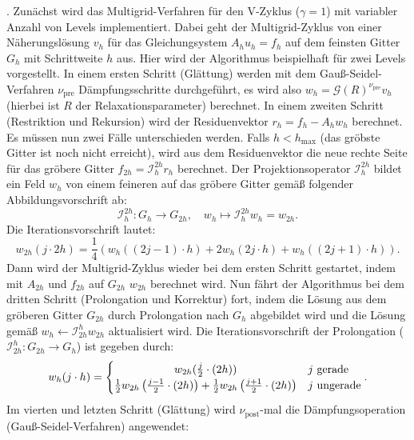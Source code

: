 \documentclass[11pt,a4paper]{article}
\begin{document}
. Zunächst wird das Multigrid-Verfahren für den V-Zyklus ($\gamma = 1$) mit variabler Anzahl von Levels implementiert. Dabei geht der Multigrid-Zyklus von einer Näherungslösung $v_h$ für das Gleichungsystem $A_h u_h = f_h$ auf dem
feinsten Gitter $G_h$ mit Schrittweite $h$ aus. Hier wird der Algorithmus beispielhaft für zwei Levels vorgestellt. In einem ersten Schritt (Glättung) werden mit dem Gauß-Seidel-Verfahren $\nu_{\mathrm{pre}}$ Dämpfungsschritte durchgeführt, es wird also $w_h = \mathcal{G}(R)^{\nu_{\mathrm{pre}}} v_h$ (hierbei ist $R$ der Relaxationsparameter) berechnet.
In einem zweiten Schritt (Restriktion und Rekursion) wird der Residuenvektor $r_h = f_h - A_h w_h$ berechnet. Es müssen nun zwei Fälle unterschieden werden. Falls $h<h_{\mathrm{max}}$ (das gröbste Gitter ist noch nicht erreicht), wird aus dem Residuenvektor die neue rechte Seite für das gröbere
Gitter $f_{2h} = \mathcal{I}_h^{2h} r_h$ berechnet. Der Projektionsoperator $\mathcal{I}_h^{2h}$ bildet ein Feld $w_h$ von einem feineren auf das gröbere Gitter gemäß folgender Abbildungsvorschrift ab:
\begin{equation*}
    \mathcal{I}_h^{2h} : G_h \rightarrow G_{2h} , \quad w_h \mapsto \mathcal{I}_h^{2h} w_h = w_{2h} .
\end{equation*} Die Iterationsvorschrift lautet:
\begin{equation*}
    w_{2h}(j \cdot 2h) = \frac{1}{4} (w_h((2j - 1) \cdot h) + 2 w_h(2j \cdot h) + w_h((2j + 1) \cdot h)) .
\end{equation*}
Dann wird der Multigrid-Zyklus wieder bei dem ersten Schritt gestartet, indem mit $A_{2h}$ und $f_{2h}$ auf $G_{2h}$ $w_{2h}$ berechnet wird. Nun fährt der Algorithmus bei dem dritten Schritt (Prolongation und Korrektur) fort, indem die Lösung aus dem
gröberen Gitter $G_{2h}$ durch Prolongation nach $G_h$ abgebildet wird und die Lösung gemäß $w_h \leftarrow \mathcal{I}_{2h}^h w_{2h}$ aktualisiert wird. Die Iterationsvorschrift der Prolongation ($\mathcal{I}_{2h}^h : G_{2h} \rightarrow G_h$) ist gegeben durch:
\begin{equation*}
    w_h(j \cdot h) = 
    \begin{cases}
        \hfil w_{2h}(\frac{j}{2} \cdot (2h)) & j \ \mathrm{gerade} \\
        \frac{1}{2} w_{2h} \left(\frac{j-1}{2} \cdot (2h)\right) + \frac{1}{2} w_{2h} \left(\frac{j+1}{2} \cdot (2h)\right) & j \ \mathrm{ungerade}    
    \end{cases} .
\end{equation*} Im vierten und letzten Schritt (Glättung) wird $\nu_{\mathrm{post}}$-mal die Dämpfungsoperation (Gauß-Seidel-Verfahren) angewendet:
\end{document}
